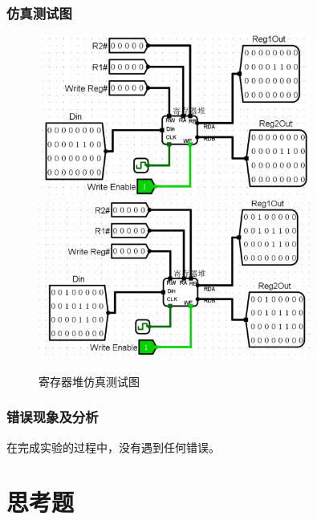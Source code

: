 \documentclass{article}
\begin{document}
    \subsubsection{仿真测试图}
    \begin{figure}[H]
    \centering
    \includegraphics[width=0.8\textwidth]{5.5.1.png}
    \includegraphics[width=0.8\textwidth]{5.5.2.png}
    \caption{寄存器堆仿真测试图}
    \end{figure}

    \subsubsection{错误现象及分析}  
    在完成实验的过程中，没有遇到任何错误。



    
    
    \section{思考题}
\end{document}
